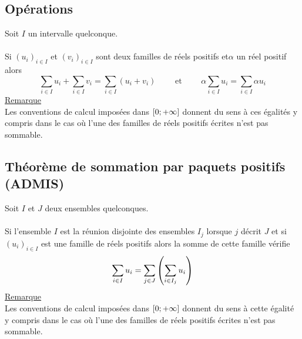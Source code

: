 \subsection{Opérations}
\begin{defprop}
    Soit \(I\) un intervalle quelconque.\\~\\
    Si \((u_i)_{i\in I}\) et \((v_i)_{i\in I}\) sont deux familles de réels positifs et\( \alpha\)  un réel positif alors
    \[\sum_{i\in I}u_i + \sum_{i\in I} v_i = \sum_{i\in I}(u_i + v_i)\qquad \text{  et }\qquad \alpha  \sum_{i\in I}u_i = \sum_{i\in I}\alpha u_i\]
    \underline{Remarque}\\
    Les conventions de calcul imposées dans \(\left[0;+\infty\right]\) donnent du sens à ces égalités y compris dans le cas où l’une des familles de réels positifs écrites n’est pas sommable.
\end{defprop}
\subsection{Théorème de sommation par paquets positifs (ADMIS)}
\begin{theo}
    Soit \(I\) et \(J\) deux ensembles quelconques.\\~\\
    Si l’ensemble \(I\) est la réunion disjointe des ensembles \(I_j\) lorsque \(j\) décrit \(J\) et si \((u_i)_{i\in I}\) est une famille de réels positifs alors la somme de cette famille vérifie
    \[\sum_{i\in I}u_i = \sum_{j\in J} \left(\sum_{i\in I_j}u_i\right)\]
    \underline{Remarque}\\
    Les conventions de calcul imposées dans \(\left[0;+\infty\right]\) donnent du sens à cette égalité y compris dans le cas où l’une des familles de réels positifs écrites n’est pas sommable.
\end{theo}
